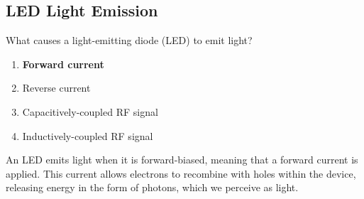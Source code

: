 \subsection{LED Light Emission}
\label{T6B07}

\begin{tcolorbox}[colback=gray!10!white,colframe=black!75!black,title=T6B07]
What causes a light-emitting diode (LED) to emit light?
\begin{enumerate}[noitemsep]
    \item \textbf{Forward current}
    \item Reverse current
    \item Capacitively-coupled RF signal
    \item Inductively-coupled RF signal
\end{enumerate}
\end{tcolorbox}

An LED emits light when it is forward-biased, meaning that a forward current is applied. This current allows electrons to recombine with holes within the device, releasing energy in the form of photons, which we perceive as light.
